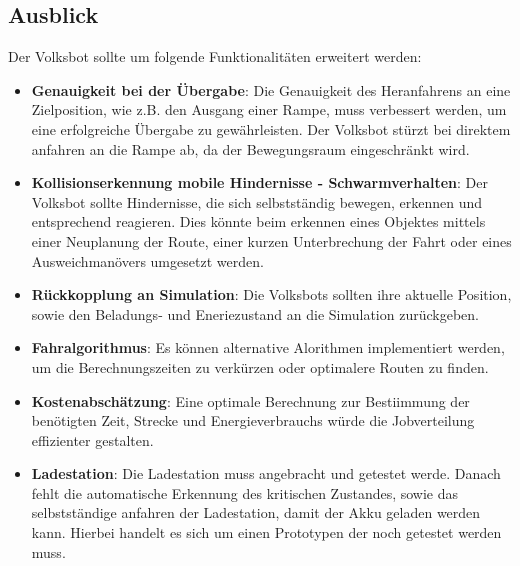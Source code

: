 \subsection{Ausblick}

Der Volksbot sollte um folgende Funktionalitäten erweitert werden:

\begin{itemize}

\item \textbf{Genauigkeit bei der Übergabe}: Die Genauigkeit des Heranfahrens an eine Zielposition, wie z.B. den Ausgang einer Rampe, muss verbessert werden, um eine erfolgreiche Übergabe zu gewährleisten. Der Volksbot stürzt bei direktem anfahren an die Rampe ab, da der Bewegungsraum eingeschränkt wird.

\item \textbf{Kollisionserkennung mobile Hindernisse - Schwarmverhalten}: Der Volksbot sollte Hindernisse, die sich selbstständig bewegen, erkennen und entsprechend reagieren. Dies könnte beim erkennen eines Objektes mittels einer Neuplanung der Route, einer kurzen Unterbrechung der Fahrt oder eines Ausweichmanövers umgesetzt werden.

\item \textbf{Rückkopplung an Simulation}: Die Volksbots sollten ihre aktuelle Position, sowie den Beladungs- und Eneriezustand an die Simulation zurückgeben.

\item \textbf{Fahralgorithmus}: Es können alternative Alorithmen implementiert werden, um die Berechnungszeiten zu verkürzen oder optimalere Routen zu finden.

\item \textbf{Kostenabschätzung}: Eine optimale Berechnung zur Bestiimmung der benötigten Zeit, Strecke und Energieverbrauchs würde die Jobverteilung effizienter gestalten.

\item \textbf{Ladestation}: Die Ladestation muss angebracht und getestet werde. Danach fehlt die automatische Erkennung des kritischen Zustandes, sowie das selbstständige anfahren der Ladestation, damit der Akku geladen werden kann. Hierbei handelt es sich um einen Prototypen der noch getestet werden muss.

\end{itemize}
